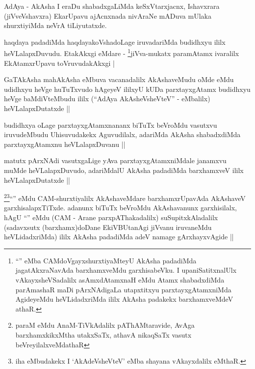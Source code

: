 \begin{artha}
AdAya - AkAsha I eraDu shabadxgaLiMda keSxVtarxjacnx, Ishavxrara (jiVveVshavxra) EkarUpavu ajAcnxnada nivAraNe mADuva mUlaka shurxtiyiMda neVrA tiLiyutatxde.
\end{artha}

\begin{artha}
haqdaya padadiMda haqdayakoVshadoLage iruvadariMda budidhxyu ililx heVLalapxDuvudu. EtakAkxgi eMdare - \footnote{``\stext'' eMba CAMdoVgayxshurxtiyaMteyU AkAsha padadiMda jagatAkxraNavAda barxhamxveMdu garxhisabeVku. I upaniSatitxnalUlx vAkayxsheVSadalilx asAmxdAtamxnaH eMdu Atamx shabadxdiMda parAmashaR maDi pArxNAdigaLa utapxtitxyu parxtayxgAtamxniMda AgideyeMdu heVLidadxriMda ililx AkAsha padakekx barxhamxveMdeV athaR.}jiVva-mukatx paramAtamx ivaralilx EkAtamxrUpavu toVruvudakAkxgi |
\end{artha}

\begin{artha}
GaTAkAsha mahAkAsha eMbuva vacanadalilx AkAshaveMudu oMde eMdu udidhxyu heVge huTuTxvudo hAgeyeV ililxyU kUDa parxtayxgAtamx budidhxyu heVge baMdiVteMbudu ililx (``AdAya AkAsheVsheVteV'' - eMbalilx) heVLalapxDutatxde ||
\end{artha}

\begin{artha}
budidhxya oLage parxtayxgAtamxnananx biTuTx beVroMdu vasutxvu iruvudeMbudu Uhisuvudakekx Aguvudilalx, adariMda AkAsha shabadxdiMda parxtayxgAtamxnu heVLalapxDuvanu ||
\end{artha}

\begin{artha}
matutx pArxNAdi vasutxgaLige yAva parxtayxgAtamxniMdale janamxvu muMde heVLalapxDuvudo, adariMdalU AkAsha padadiMda barxhamxveV ililx heVLalapxDutatxde ||
\end{artha}


\begin{artha}
\footnote{paraM eMdu AnaM-TiVkAdalilx pAThAMtaravide, AvAga barxhamxkikxMtha utakxSaTx, athavA nikaqSaTx vasutx beVreyilalxveMdathaR}\footnote{iha eMbudakekx I `AkAdeVsheVteV' eMba shayana vAkayxdalilx eMthaR.}``\stext'' eMdu CAM-shurxtiyalilx AkAshaveMdare barxhamxrUpavAda AkAshaveV garxhisalapxTiTxde. adanunx biTuTx beVroMdu AkAshavanunx garxhisilalx, hAgU ``\stext'' eMdu (CAM - Arane parxpAThakadalilx) suSupitxkAladalilx (sadavxsutx (barxhamx)doDane EkiVBUtanAgi jiVvanu iruvaneMdu heVLidadxriMda) ililx AkAsha padadiMda adeV namage gArxhayxvAgide ||
\end{artha}

